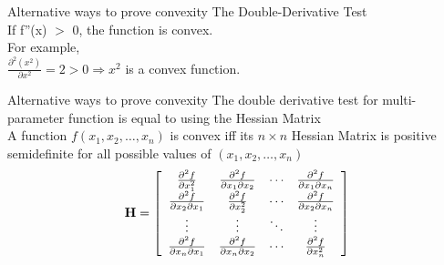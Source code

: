\documentclass{beamer}
\begin{document}
	\begin{frame}{Alternative ways to prove convexity}
	The Double-Derivative Test\\
	\vspace{1cm}
	If f''(x) $>$ 0, the function is  convex.\\
	\vspace{1cm}
	For example,\\
	\vspace{1cm}
	$\frac{\partial^2(x^2)}{\partial x^2} = 2 > 0 \Rightarrow x^2$ is a convex function.\\  
	\end{frame}

	\begin{frame}{Alternative ways to prove convexity}
	The double derivative test for multi-parameter function is equal to using the Hessian Matrix\\
	\vspace{1cm}
	A function $f(x_1,x_2,\ldots,x_n)$ is convex iff its $n \times n$ Hessian Matrix is positive semidefinite for all possible values of $(x_1,x_2,\ldots, x_n)$\\
	\begin{equation*}
\mathbf{H}=\left[\begin{array}{cccc}
{\frac{\partial^{2} f}{\partial x_{1}^{2}}} & {\frac{\partial^{2} f}{\partial x_{1} \partial x_{2}}} & {\cdots} & {\frac{\partial^{2} f}{\partial x_{1} \partial x_{n}}} \\
{\frac{\partial^{2} f}{\partial x_{2} \partial x_{1}}} & {\frac{\partial^{2} f}{\partial x_{2}^{2}}} & {\cdots} & {\frac{\partial^{2} f}{\partial x_{2} \partial x_{n}}} \\
{\vdots} & {\vdots} & {\ddots} & {\vdots} \\
{\frac{\partial^{2} f}{\partial x_{n} \partial x_{1}}} & {\frac{\partial^{2} f}{\partial x_{n} \partial x_{2}}} & {\cdots} & {\frac{\partial^{2} f}{\partial x_{n}^{2}}}
\end{array}\right]
\end{equation*}
	\end{frame}
\end{document}
